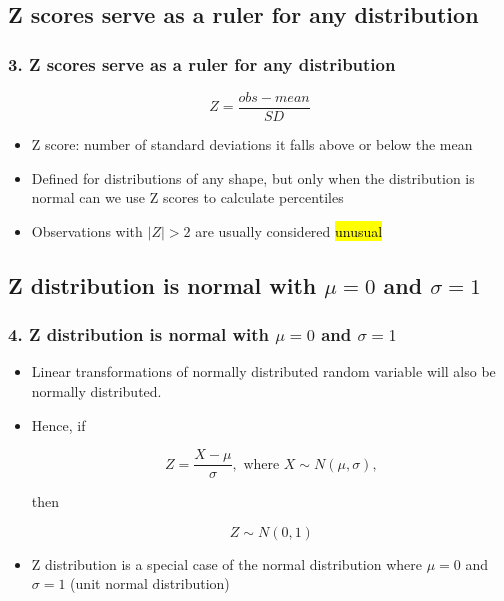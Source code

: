 \documentclass[11pt,containsverbatim,handout,xcolor=xelatex,dvipsnames,table]{beamer}
\begin{document}

\subsection{Z scores serve as a ruler for any distribution}
\label{mi3}


\begin{frame}
\frametitle{3. Z scores serve as a ruler for any distribution}

\[ Z = \frac{obs - mean}{SD} \]

\begin{itemize}

\item Z score: number of standard deviations it falls above or below the mean

\pause

\item Defined for distributions of any shape, but only when the distribution is normal can we use Z scores to calculate percentiles

\pause

\item Observations with $|Z| > 2$ are usually considered \hl{unusual}

\end{itemize}

\end{frame}


\subsection{Z distribution is normal with $\mu = 0$ and $\sigma = 1$}
\label{mi4}


\begin{frame}
\frametitle{4. Z distribution is normal with $\mu = 0$ and $\sigma = 1$}

\begin{itemize}

\item Linear transformations of normally distributed random variable will also be normally distributed.

\item Hence, if

\[ Z = \frac{X - \mu}{\sigma}, \text{ where } X \sim N(\mu, \sigma), \]

then

\[ Z \sim N(0,1) \]

\item Z distribution is a special case of the normal distribution where $\mu = 0$ and $\sigma = 1$ (unit normal distribution)

\end{itemize}

\end{frame}
\end{document}

